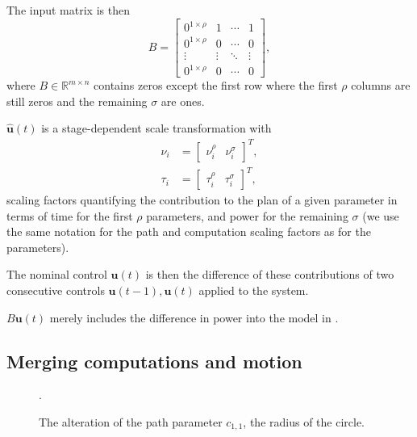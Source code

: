 The input matrix is then
\begin{equation}\label{eq:mat_B}
  B=\begin{bmatrix} 
    0^{1\times\rho} & 1      & \cdots & 1      \\
    0^{1\times\rho} & 0      & \cdots & 0      \\ 
    \vdots          & \vdots & \ddots & \vdots \\
    0^{1\times\rho} & 0      & \cdots & 0      \end{bmatrix},
\end{equation}
where $B\in\mathbb{R}^{m\times n}$ contains zeros except the first row where the first $\rho$ columns are still zeros and the remaining $\sigma$ are ones. 

$\hat{\mathbf{u}}(t)$ is a stage-dependent scale transformation with 
\begin{subequations}\label{eq:scaling}\begin{align}
\nu_i&=\begin{bmatrix}\nu_i^\rho & \nu_i^\sigma\end{bmatrix}^T,\\ 
\tau_i&=\begin{bmatrix}\tau_i^\rho & \tau_i^\sigma\end{bmatrix}^T,
\end{align}\end{subequations}
scaling factors quantifying the contribution to the plan of a given parameter in terms of time for the first $\rho$ parameters, and power for the remaining $\sigma$ (we use the same notation for the path and computation scaling factors as for the parameters). 

The nominal control $\mathbf{u}(t)$ is then the difference of these contributions of two consecutive controls $\mathbf{u}(t-1),\mathbf{u}(t)$ applied to the system. 

$B\mathbf{u}(t)$ merely includes the difference in power into the model in .



\subsection{Merging computations and motion}
\label{sec:merging}

\begin{figure}[h]
  \centering
  
  \caption[Path of a UAV flying a given stage]{.}
  \label{fig:tee1}
\end{figure}
\begin{figure}[h]
  \centering
  
  \caption[Alteration of the path parameter]{The alteration of the path parameter $c_{1,1}$, the radius of the circle.}
  \label{fig:tee1}
\end{figure}

